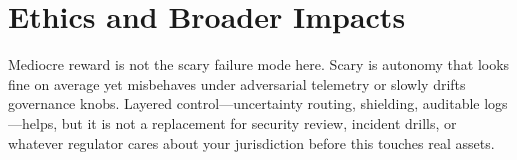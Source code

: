 \section{Ethics and Broader Impacts}

Mediocre reward is not the scary failure mode here. Scary is autonomy that looks fine on average yet misbehaves under adversarial telemetry or slowly drifts governance knobs. Layered control---uncertainty routing, shielding, auditable logs---helps, but it is not a replacement for security review, incident drills, or whatever regulator cares about your jurisdiction before this touches real assets.
